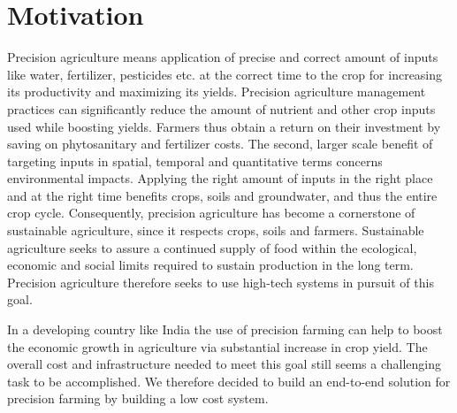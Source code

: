 \section{Motivation}

Precision agriculture means application of precise and correct amount of inputs like water, fertilizer, pesticides etc. at the correct time to the crop for increasing its productivity and maximizing its yields. Precision agriculture management practices can significantly reduce the amount of nutrient and other crop inputs used while boosting yields. Farmers thus obtain a return on their investment by saving on phytosanitary and fertilizer costs. The second, larger scale benefit of targeting inputs in spatial, temporal and quantitative terms concerns environmental impacts. Applying the right amount of inputs in the right place and at the right time benefits crops, soils and groundwater, and thus the entire crop cycle. Consequently, precision agriculture has become a cornerstone of sustainable agriculture, since it respects crops, soils and farmers. Sustainable agriculture seeks to assure a continued supply of food within the ecological, economic and social limits required to sustain production in the long term. Precision agriculture therefore seeks to use high-tech systems in pursuit of this goal. 

In a developing country like India the use of precision farming can help to boost the economic growth in agriculture via substantial increase in crop yield. The overall cost and infrastructure needed to meet this goal still seems a challenging task to be accomplished. We therefore decided to build an end-to-end solution for precision farming by building a low cost system. 

